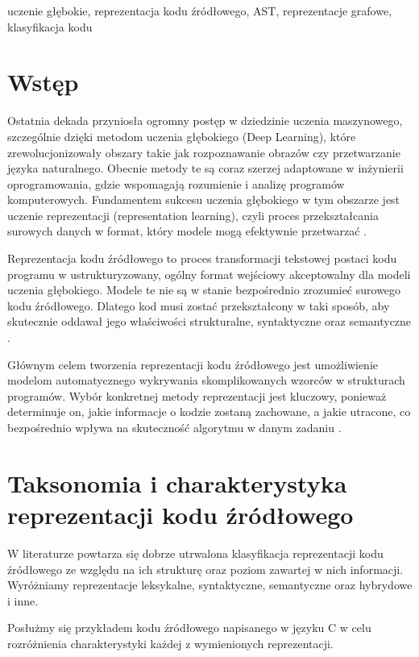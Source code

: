 \documentclass[conference]{IEEEtran}
\begin{document}
\renewcommand{\IEEEkeywordsname}{Słowa kluczowe}
\begin{IEEEkeywords}
uczenie głębokie, reprezentacja kodu źródłowego, AST, reprezentacje grafowe, klasyfikacja kodu
\end{IEEEkeywords}

\section{Wstęp}
Ostatnia dekada przyniosła ogromny postęp w dziedzinie uczenia maszynowego, szczególnie dzięki metodom uczenia głębokiego (Deep Learning), które zrewolucjonizowały obszary takie jak rozpoznawanie obrazów czy przetwarzanie języka naturalnego. Obecnie metody te są coraz szerzej adaptowane w inżynierii oprogramowania, gdzie wspomagają rozumienie i analizę programów komputerowych. Fundamentem sukcesu uczenia głębokiego w tym obszarze jest uczenie reprezentacji (representation learning), czyli proces przekształcania surowych danych w format, który modele mogą efektywnie przetwarzać \cite{b1}.

Reprezentacja kodu źródłowego to proces transformacji tekstowej postaci kodu programu w ustrukturyzowany, ogólny format wejściowy akceptowalny dla modeli uczenia głębokiego. Modele te nie są w stanie bezpośrednio zrozumieć surowego kodu źródłowego. Dlatego kod musi zostać przekształcony w taki sposób, aby skutecznie oddawał jego właściwości strukturalne, syntaktyczne oraz semantyczne \cite{b2}.

Głównym celem tworzenia reprezentacji kodu źródłowego jest umożliwienie modelom automatycznego wykrywania skomplikowanych wzorców w strukturach programów. Wybór konkretnej metody reprezentacji jest kluczowy, ponieważ determinuje on, jakie informacje o kodzie zostaną zachowane, a jakie utracone, co bezpośrednio wpływa na skuteczność algorytmu w danym zadaniu \cite{b3}.

\section{Taksonomia i charakterystyka reprezentacji kodu źródłowego}
W literaturze powtarza się dobrze utrwalona klasyfikacja reprezentacji kodu źródłowego ze względu na ich strukturę oraz poziom zawartej w nich informacji. Wyróżniamy reprezentacje leksykalne, syntaktyczne, semantyczne oraz hybrydowe i inne. 

Posłużmy się przykładem kodu źródłowego napisanego w języku C w celu rozróżnienia charakterystyki każdej z wymienionych reprezentacji.
\end{document}
